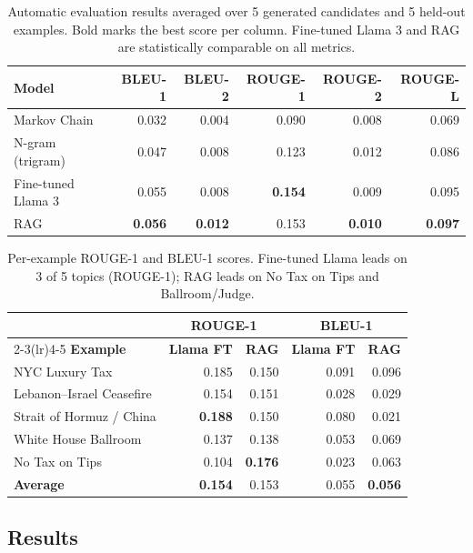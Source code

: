 \documentclass[11pt,a4paper]{article}
\begin{document}
\begin{table}[H]
\centering
\caption{Automatic evaluation results averaged over 5 generated candidates and 5 held-out examples. Bold marks the best score per column. Fine-tuned Llama 3 and RAG are statistically comparable on all metrics.}
\label{tab:results}
\begin{tabular}{lrrrrr}
\toprule
\textbf{Model} & \textbf{BLEU-1} & \textbf{BLEU-2} & \textbf{ROUGE-1} & \textbf{ROUGE-2} & \textbf{ROUGE-L} \\
\midrule
Markov Chain        & 0.032 & 0.004 & 0.090 & 0.008 & 0.069 \\
N-gram (trigram)    & 0.047 & 0.008 & 0.123 & 0.012 & 0.086 \\
Fine-tuned Llama 3  & 0.055 & 0.008 & \textbf{0.154} & 0.009 & 0.095 \\
RAG                 & \textbf{0.056} & \textbf{0.012} & 0.153 & \textbf{0.010} & \textbf{0.097} \\
\bottomrule
\end{tabular}
\end{table}

\begin{table}[H]
\centering
\caption{Per-example ROUGE-1 and BLEU-1 scores. Fine-tuned Llama leads on 3 of 5 topics (ROUGE-1); RAG leads on No Tax on Tips and Ballroom/Judge.}
\label{tab:perexample}
\begin{tabular}{lrrrr}
\toprule
 & \multicolumn{2}{c}{\textbf{ROUGE-1}} & \multicolumn{2}{c}{\textbf{BLEU-1}} \\
\cmidrule(lr){2-3}\cmidrule(lr){4-5}
\textbf{Example} & \textbf{Llama FT} & \textbf{RAG} & \textbf{Llama FT} & \textbf{RAG} \\
\midrule
NYC Luxury Tax          & 0.185 & 0.150 & 0.091 & 0.096 \\
Lebanon--Israel Ceasefire & 0.154 & 0.151 & 0.028 & 0.029 \\
Strait of Hormuz / China & \textbf{0.188} & 0.150 & 0.080 & 0.021 \\
White House Ballroom     & 0.137 & 0.138 & 0.053 & 0.069 \\
No Tax on Tips           & 0.104 & \textbf{0.176} & 0.023 & 0.063 \\
\midrule
\textbf{Average}         & \textbf{0.154} & 0.153 & 0.055 & \textbf{0.056} \\
\bottomrule
\end{tabular}
\end{table}

\subsection{Results}
\label{sec:results-note}
\end{document}
